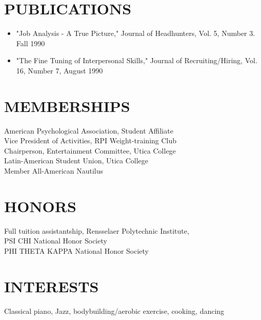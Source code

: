 \documentclass{res}
\begin{document}
\begin{resume}
\vspace{0.2in} 
\section{PUBLICATIONS} 
\vspace{15pt}
\begin{itemize}
   \item "Job Analysis - A True Picture," Journal of Headhunters, Vol. 
    5, Number 3. Fall 1990 
   \item "The   Fine  Tuning  of  Interpersonal  Skills,"  Journal  of 
    Recruiting/Hiring, Vol. 16, Number 7, August 1990 
   \end{itemize}


\vspace{0.2in} 
\section{MEMBERSHIPS} 
\vspace{-5pt} %
\begin{center}
      American Psychological Association, Student Affiliate \\
      Vice President of Activities, RPI Weight-training Club \\ 
      Chairperson, Entertainment Committee, Utica College \\ 
      Latin-American Student Union, Utica College \\
      Member All-American Nautilus 
 \end{center}
 \vspace{0.2in}
\section{HONORS} 
\vspace{-5pt}
\begin{center}
  Full tuition assistantship, Rensselaer Polytechnic Institute,  \\
                  PSI CHI National Honor Society \\
              PHI THETA KAPPA National Honor Society 
\end{center}
 
\vspace{0.2in}
\section{INTERESTS} 

\begin{center}
Classical piano, Jazz,  bodybuilding/aerobic  exercise,  cooking, 
                             dancing
\end{center} 
 
\end{resume} 
\end{document}
